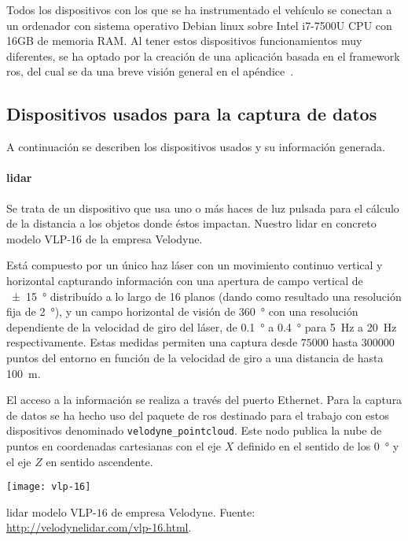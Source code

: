 Todos los dispositivos con los que se ha instrumentado el vehículo se conectan a un ordenador con sistema operativo Debian \gls{linux} sobre Intel i7-7500U CPU con 16GB de memoria RAM. Al tener estos dispositivos funcionamientos muy diferentes, se ha optado por la creación de una aplicación basada en el framework \Acrfull{ros}, del cual se da una breve visión general en el apéndice~.

\subsection{Dispositivos usados para la captura de datos}

A continuación se describen los dispositivos usados y su información generada.

\paragraph{\acrshort{lidar}}

Se trata de un dispositivo que usa uno o más haces de luz pulsada para el cálculo de la distancia a los objetos donde éstos impactan. Nuestro \acrshort{lidar} en concreto modelo VLP-16 de la empresa Velodyne.

Está compuesto por un único haz láser con un movimiento continuo vertical y horizontal capturando información con una apertura de campo vertical de \SI{\pm15}{\degree} distribuído a lo largo de 16 planos (dando como resultado una resolución fija de \SI{2}{\degree}), y un campo horizontal de visión de \SI{360}{\degree} con una resolución dependiente de la velocidad de giro del láser, de \SI{0.1}{\degree} a \SI{0.4}{\degree} para \SI{5}{\Hz} a \SI{20}{\Hz} respectivamente. Estas medidas permiten una captura desde $75000$ hasta $300000$ puntos del entorno en función de la velocidad de giro a una distancia de hasta \SI{100}{\meter}.

El acceso a la información se realiza a través del puerto Ethernet. Para la captura de datos se ha hecho uso del paquete de \ac{ros} destinado para el trabajo con estos dispositivos denominado \texttt{velodyne\_pointcloud}. Este nodo publica la nube de puntos en coordenadas cartesianas con el eje $X$ definido en el sentido de los \SI{0}{\degree} y el eje $Z$ en sentido ascendente.

\begin{marginfigure}
	\texttt{[image: vlp-16]}
	\caption[\acrshort{lidar} modelo VLP-$16$ de empresa Velodyne]{\acrshort{lidar} modelo VLP-$16$ de empresa Velodyne. Fuente: \url{http://velodynelidar.com/vlp-16.html}.}
	\label{fig:vlp-16}
\end{marginfigure}

